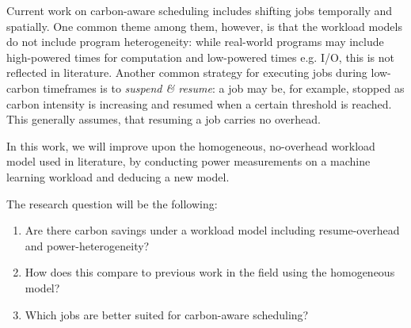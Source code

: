 Current work on carbon-aware scheduling includes shifting jobs temporally and spatially. 
One common theme among them, however, is that the workload models do not include program heterogeneity: while real-world programs may include high-powered times for computation and low-powered times e.g. I/O, this is not reflected in literature. 
Another common strategy for executing jobs during low-carbon timeframes is to \emph{suspend \& resume}: a job may be, for example, stopped as carbon intensity is increasing and resumed when a certain threshold is reached. 
This generally assumes, that resuming a job carries no overhead. 

In this work, we will improve upon the homogeneous, no-overhead workload model used in literature, by conducting power measurements on a machine learning workload and deducing a new model.

The research question will be the following:

\begin{enumerate}
    \item Are there carbon savings under a workload model including resume-overhead and power-heterogeneity?
    \item How does this compare to previous work in the field using the homogeneous model?
    \item Which jobs are better suited for carbon-aware scheduling?
\end{enumerate}
